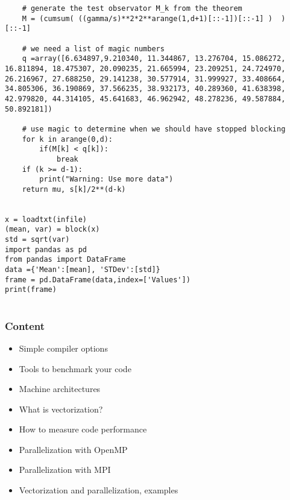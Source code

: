 \documentclass{beamer}
\begin{document}
\begin{frame}
\begin{verbatim}
    # generate the test observator M_k from the theorem
    M = (cumsum( ((gamma/s)**2*2**arange(1,d+1)[::-1])[::-1] )  )[::-1]

    # we need a list of magic numbers
    q =array([6.634897,9.210340, 11.344867, 13.276704, 15.086272, 16.811894, 18.475307, 20.090235, 21.665994, 23.209251, 24.724970, 26.216967, 27.688250, 29.141238, 30.577914, 31.999927, 33.408664, 34.805306, 36.190869, 37.566235, 38.932173, 40.289360, 41.638398, 42.979820, 44.314105, 45.641683, 46.962942, 48.278236, 49.587884, 50.892181])

    # use magic to determine when we should have stopped blocking
    for k in arange(0,d):
        if(M[k] < q[k]):
            break
    if (k >= d-1):
        print("Warning: Use more data")
    return mu, s[k]/2**(d-k)


x = loadtxt(infile)
(mean, var) = block(x) 
std = sqrt(var)
import pandas as pd
from pandas import DataFrame
data ={'Mean':[mean], 'STDev':[std]}
frame = pd.DataFrame(data,index=['Values'])
print(frame)


\end{verbatim}
\end{frame}

\begin{frame}
\frametitle{Content}

\begin{itemize}
\item Simple compiler options 

\item Tools to benchmark your code

\item Machine architectures

\item What is vectorization?

\item How to measure code performance

\item Parallelization with OpenMP

\item Parallelization with MPI

\item Vectorization and parallelization, examples
\end{itemize}

\noindent
\end{frame}
\end{document}
